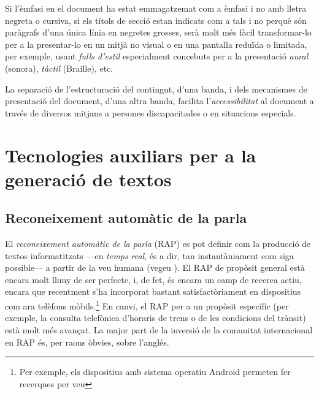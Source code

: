 Si l'èmfasi en el document ha estat emmagatzemat com a èmfasi i no amb
lletra negreta o cursiva, si els títols de secció estan indicats com a
tals i no perquè són paràgrafs d'una única línia en negretes grosses,
serà molt més fàcil transformar-lo per a la presentar-lo en un mitjà
no visual o en una pantalla reduïda o limitada, per exemple, usant
\emph{fulls d'estil} especialment concebuts per a la presentació
\emph{aural} (sonora), \emph{tàctil} (Braille), etc.

La separació de l'estructuració del contingut, d'una banda, i dels
mecanismes de presentació del document, d'una altra banda, facilita
l'\emph{accessibilitat} al document a través de diversos mitjans a
persones discapacitades o en situacions especials.

 
\section{Tecnologies auxiliars per a la generació de textos}


\subsection{Reconeixement automàtic de la parla}
\label{ss:recparla}

El \emph{reconeixement automàtic de la parla} (RAP) es pot definir com
la producció de textos informatitzats ---en \emph{temps real}, és a
dir, tan instantàniament com siga possible--- a partir de la veu
humana (vegeu \citealt{samuelson-brown96b}). El RAP de propòsit
general està encara molt lluny de ser perfecte, i, de fet, és encara
un camp de recerca actiu, encara que recentment s'ha incorporat
bastant satisfactòriament en dispositius com ara telèfons mòbils.\footnote{Per exemple, els dispositius amb sistema operatiu Android permeten fer recerques per veu}  En
canvi, el RAP per a un propòsit específic (per exemple, la consulta
telefònica d'horaris de trens o de les condicions del trànsit) està
molt més avançat. La major part de la inversió de la comunitat
internacional en RAP és, per raons òbvies, sobre l'anglés.

